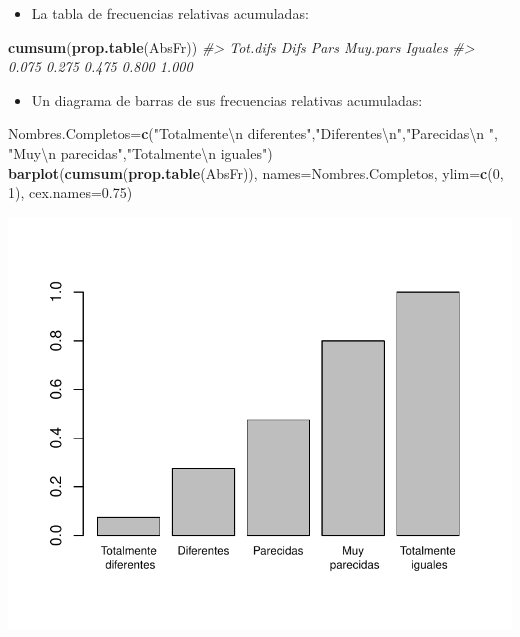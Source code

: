 \documentclass[
]{book}
\newenvironment{Shaded}{\begin{snugshade}}{\end{snugshade}}
\newcommand{\CharTok}[1]{\textcolor[rgb]{0.31,0.60,0.02}{#1}}
\newcommand{\CommentTok}[1]{\textcolor[rgb]{0.56,0.35,0.01}{\textit{#1}}}
\newcommand{\DataTypeTok}[1]{\textcolor[rgb]{0.13,0.29,0.53}{#1}}
\newcommand{\DecValTok}[1]{\textcolor[rgb]{0.00,0.00,0.81}{#1}}
\newcommand{\FloatTok}[1]{\textcolor[rgb]{0.00,0.00,0.81}{#1}}
\newcommand{\KeywordTok}[1]{\textcolor[rgb]{0.13,0.29,0.53}{\textbf{#1}}}
\newcommand{\NormalTok}[1]{#1}
\newcommand{\StringTok}[1]{\textcolor[rgb]{0.31,0.60,0.02}{#1}}
\providecommand{\tightlist}{%
  \setlength{\itemsep}{0pt}\setlength{\parskip}{0pt}}
\theoremstyle{definition}
\theoremstyle{definition}
\theoremstyle{definition}
\theoremstyle{remark}
\begin{document}
\begin{itemize}
\tightlist
\item
  La tabla de frecuencias relativas acumuladas:
\end{itemize}

\begin{Shaded}
\begin{Highlighting}[]
\KeywordTok{cumsum}\NormalTok{(}\KeywordTok{prop.table}\NormalTok{(AbsFr))}
\CommentTok{\#\textgreater{} Tot.difs     Difs     Pars Muy.pars  Iguales }
\CommentTok{\#\textgreater{}    0.075    0.275    0.475    0.800    1.000}
\end{Highlighting}
\end{Shaded}

\begin{itemize}
\tightlist
\item
  Un diagrama de barras de sus frecuencias relativas acumuladas:
\end{itemize}

\begin{Shaded}
\begin{Highlighting}[]
\NormalTok{Nombres.Completos=}\KeywordTok{c}\NormalTok{(}\StringTok{"Totalmente}\CharTok{\textbackslash{}n}\StringTok{ diferentes"}\NormalTok{,}\StringTok{"Diferentes}\CharTok{\textbackslash{}n}\StringTok{"}\NormalTok{,}\StringTok{"Parecidas}\CharTok{\textbackslash{}n}\StringTok{ "}\NormalTok{,}
                    \StringTok{"Muy}\CharTok{\textbackslash{}n}\StringTok{ parecidas"}\NormalTok{,}\StringTok{"Totalmente}\CharTok{\textbackslash{}n}\StringTok{ iguales"}\NormalTok{)}
\KeywordTok{barplot}\NormalTok{(}\KeywordTok{cumsum}\NormalTok{(}\KeywordTok{prop.table}\NormalTok{(AbsFr)), }\DataTypeTok{names=}\NormalTok{Nombres.Completos, }\DataTypeTok{ylim=}\KeywordTok{c}\NormalTok{(}\DecValTok{0}\NormalTok{, }\DecValTok{1}\NormalTok{), }\DataTypeTok{cex.names=}\FloatTok{0.75}\NormalTok{)}
\end{Highlighting}
\end{Shaded}

\begin{center}\includegraphics[width=0.9\linewidth]{11chap11_Descripcion_ordinales_files/figure-latex/unnamed-chunk-21-1} \end{center}
\end{document}
